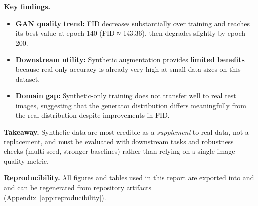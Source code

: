 \textbf{Key findings.}
\begin{itemize}
\item \textbf{GAN quality trend:} FID decreases substantially over training and reaches its best value at epoch 140 (FID ≈ 143.36), then degrades slightly by epoch 200.
\item \textbf{Downstream utility:} Synthetic augmentation provides \textbf{limited benefits} because real-only accuracy is already very high at small data sizes on this dataset.
\item \textbf{Domain gap:} Synthetic-only training does not transfer well to real test images, suggesting that the generator distribution differs meaningfully from the real distribution despite improvements in FID.
\end{itemize}

\textbf{Takeaway.} Synthetic data are most credible as a \emph{supplement} to real data, not a replacement, and must be evaluated with downstream tasks and robustness checks (multi-seed, stronger baselines) rather than relying on a single image-quality metric.

\textbf{Reproducibility.} All figures and tables used in this report are exported into  and  and can be regenerated from repository artifacts (Appendix~\ref{app:reproducibility}).

\clearpage
